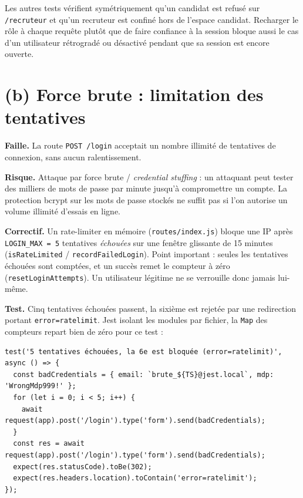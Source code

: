 \documentclass[12pt,a4paper]{article}
\begin{document}
Les autres tests vérifient symétriquement qu'un candidat est refusé sur \texttt{/recruteur} et qu'un recruteur est confiné hors de l'espace candidat. Recharger le rôle à chaque requête plutôt que de faire confiance à la session bloque aussi le cas d'un utilisateur rétrogradé ou désactivé pendant que sa session est encore ouverte.

\section{(b) Force brute : limitation des tentatives}

\textbf{Faille.} La route \texttt{POST /login} acceptait un nombre illimité de tentatives de connexion, sans aucun ralentissement.

\textbf{Risque.} Attaque par force brute / \textit{credential stuffing}  : un attaquant peut tester des milliers de mots de passe par minute jusqu'à compromettre un compte. La protection bcrypt sur les mots de passe stockés ne suffit pas si l'on autorise un volume illimité d'essais en ligne.

\textbf{Correctif.} Un rate-limiter en mémoire (\texttt{routes/index.js}) bloque une IP après \texttt{LOGIN\_MAX = 5} tentatives \textit{échouées} sur une fenêtre glissante de 15 minutes (\texttt{isRateLimited} / \texttt{recordFailedLogin}). Point important : seules les tentatives échouées sont comptées, et un succès remet le compteur à zéro (\texttt{resetLoginAttempts}). Un utilisateur légitime ne se verrouille donc jamais lui-même.

\textbf{Test.} Cinq tentatives échouées passent, la sixième est rejetée par une redirection portant \texttt{error=ratelimit}. Jest isolant les modules par fichier, la \texttt{Map} des compteurs repart bien de zéro pour ce test :

\begin{lstlisting}
test('5 tentatives échouées, la 6e est bloquée (error=ratelimit)', async () => {
  const badCredentials = { email: `brute_${TS}@jest.local`, mdp: 'WrongMdp999!' };
  for (let i = 0; i < 5; i++) {
    await request(app).post('/login').type('form').send(badCredentials);
  }
  const res = await request(app).post('/login').type('form').send(badCredentials);
  expect(res.statusCode).toBe(302);
  expect(res.headers.location).toContain('error=ratelimit');
});
\end{lstlisting}

\end{document}
